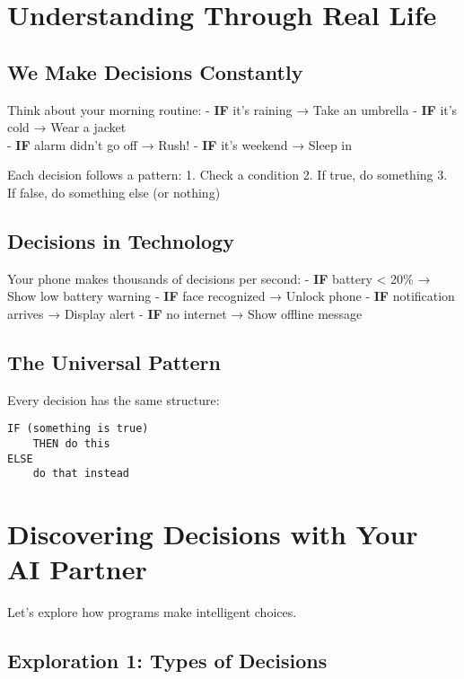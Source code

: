 \documentclass[
  letterpaper,
  DIV=11,
  numbers=noendperiod,
  oneside]{scrreprt}
\begin{document}
\section{Understanding Through Real
Life}\label{understanding-through-real-life-3}

\subsection{We Make Decisions
Constantly}\label{we-make-decisions-constantly}

Think about your morning routine: - \textbf{IF} it's raining → Take an
umbrella - \textbf{IF} it's cold → Wear a jacket\\
- \textbf{IF} alarm didn't go off → Rush! - \textbf{IF} it's weekend →
Sleep in

Each decision follows a pattern: 1. Check a condition 2. If true, do
something 3. If false, do something else (or nothing)

\subsection{Decisions in Technology}\label{decisions-in-technology}

Your phone makes thousands of decisions per second: - \textbf{IF}
battery \textless{} 20\% → Show low battery warning - \textbf{IF} face
recognized → Unlock phone - \textbf{IF} notification arrives → Display
alert - \textbf{IF} no internet → Show offline message

\subsection{The Universal Pattern}\label{the-universal-pattern}

Every decision has the same structure:

\begin{verbatim}
IF (something is true)
    THEN do this
ELSE
    do that instead
\end{verbatim}

\section{Discovering Decisions with Your AI
Partner}\label{discovering-decisions-with-your-ai-partner}

Let's explore how programs make intelligent choices.

\subsection{Exploration 1: Types of
Decisions}\label{exploration-1-types-of-decisions}
\end{document}
